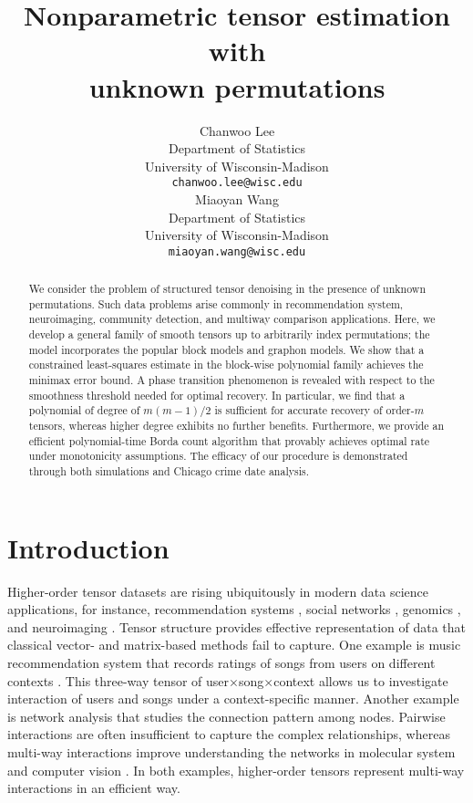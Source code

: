 \documentclass{article}
\title{Nonparametric tensor estimation with \\
unknown permutations}
\author{%
  Chanwoo Lee \\
  Department of Statistics\\
  University of Wisconsin-Madison\\
  \texttt{chanwoo.lee@wisc.edu} \\
   \And
   Miaoyan Wang \\
   Department of Statistics \\
   University of Wisconsin-Madison \\
   \texttt{miaoyan.wang@wisc.edu} \\
}
\theoremstyle{definition}
\begin{document}
\maketitle

\begin{abstract}
 We consider the problem of structured tensor denoising in the presence of unknown permutations. Such data problems arise commonly in recommendation system, neuroimaging, community detection, and multiway comparison applications. Here, we develop a general family of smooth tensors up to arbitrarily index permutations; the model incorporates the popular block models and graphon models. We show that a constrained least-squares estimate in the block-wise polynomial family achieves the minimax error bound. A phase transition phenomenon is revealed with respect to the smoothness threshold needed for optimal recovery. In particular, we find that a polynomial of degree of $m(m-1)/2$ is sufficient for accurate recovery of order-$m$ tensors, whereas higher degree exhibits no further benefits.  Furthermore, we provide an efficient polynomial-time Borda count algorithm that provably achieves optimal rate under monotonicity assumptions. The efficacy of our procedure is demonstrated through both simulations and Chicago crime date analysis. 
\end{abstract}
\vspace{-.3cm}
\section{Introduction}\label{sec:int}
\vspace{-.3cm}
Higher-order tensor datasets are rising ubiquitously in modern data science applications, for instance, recommendation systems \citep{baltrunas2011incarmusic}, social networks \citep{nickel2011three},
genomics \citep{wang2019common}, and neuroimaging \citep{zhou2013tensor}.
Tensor structure provides effective representation of data that classical vector- and matrix-based methods fail to capture. 
One example is music recommendation system that records ratings of songs from users on different contexts \citep{baltrunas2011incarmusic}. This three-way tensor of user$\times$song$\times$context allows us to investigate interaction of users and songs under a context-specific manner.
Another example is network analysis that studies the connection pattern among nodes.  Pairwise interactions are often insufficient to capture the complex relationships, whereas multi-way interactions improve understanding the networks in molecular system \citep{Michoel2012AlignmentAI} and computer vision \citep{Agarwal2006HigherOL}. In both examples, higher-order tensors represent multi-way interactions in an efficient way.
\end{document}
